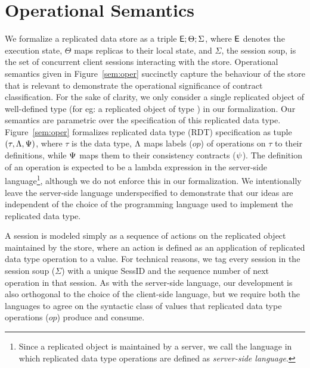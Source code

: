 \section{Operational Semantics}
\label{sec:core-opsem}

We formalize a replicated data store as a triple ${\normalfont \textsf{E}};\Theta;\Sigma$,
where ${\normalfont \textsf{E}}$ denotes the execution state, $\Theta$ maps replicas to
their local state, and $\Sigma$, the session soup, is the set of
concurrent client sessions interacting with the store.  Operational
semantics given in Figure~\ref{sem:oper} succinctly capture the
behaviour of the store that is relevant to demonstrate the operational
significance of contract classification. For the sake of clarity, we
only consider a single replicated object of well-defined type (for eg:
a replicated object of type ) in our formalization.
Our semantics are parametric over the specification of this replicated
data type.  Figure~\ref{sem:oper} formalizes replicated data type
(RDT) specification as tuple $(\tau,\Lambda,\Psi)$, where $\tau$ is the
data type, $\Lambda$ maps labels ($op$) of operations on $\tau$ to their
definitions, while $\Psi$ maps them to their consistency contracts
($\psi$). The definition of an operation is expected to be a lambda
expression in the server-side language\footnote{Since a replicated
object is maintained by a server, we call the language in which
replicated data type operations are defined as \emph{server-side
language}.}, although we do not enforce this in our formalization. We
intentionally leave the server-side language underspecified to
demonstrate that our ideas are independent of the choice of the
programming language used to implement the replicated data type. 



A session is modeled simply as a sequence of actions on the replicated
object maintained by the store, where an action is defined as an
application of replicated data type operation to a value. For
technical reasons, we tag every session in the session soup ($\Sigma$)
with a unique {\sf SessID} and the sequence number of next operation
in that session. As with the server-side language, our development is
also orthogonal to the choice of the client-side language, but we
require both the languages to agree on the syntactic class of values
that replicated data type operations ($op$) produce and consume. 

